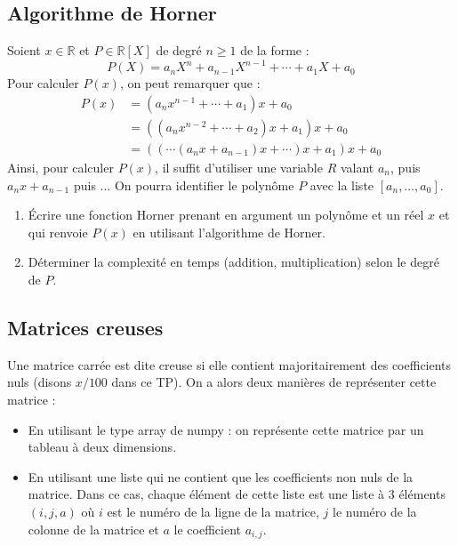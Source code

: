 \documentclass[french,11pt,twoside]{VcCours}
\begin{document}
\subsection{Algorithme de Horner}
Soient $x \in \mathbb{R}$ et $P \in \mathbb{R}[X]$ de degré $n \geq 1$ de la forme :
$$ P(X) = a_n X^n + a_{n-1} X^{n-1} + \cdots + a_1 X + a_0 $$
Pour calculer $P(x)$, on peut remarquer que :
\begin{align*}
P(x) & = (a_n x^{n-1} + \cdots + a_1)x + a_0 \\
& = ((a_n x^{n-2} + \cdots + a_2)x + a_1)x + a_0 \\
& = ((\cdots(a_n x + a_{n-1})x + \cdots)x + a_1)x + a_0
\end{align*}
Ainsi, pour calculer $P(x)$, il suffit d'utiliser une variable $R$ valant $a_n$, puis $a_nx+a_{n-1}$ puis ... On pourra identifier le polynôme $P$ avec la liste $[a_n, \ldots, a_0]$.

\begin{enumerate}
\item Écrire une fonction Horner prenant en argument un polynôme et un réel $x$ et qui renvoie $P(x)$ en utilisant l'algorithme de Horner.
\item Déterminer la complexité en temps (addition, multiplication) selon le degré de $P$.
\end{enumerate}

\subsection{Matrices creuses}

Une matrice carrée est dite creuse si elle contient majoritairement des coefficients nuls (disons $x/100$ dans ce TP). On a alors deux manières de représenter cette matrice :

\begin{itemize}
\item En utilisant le type array de numpy : on représente cette matrice par un tableau à deux dimensions.
\item En utilisant une liste qui ne contient que les coefficients non nuls de la matrice. Dans ce cas, chaque élément de cette liste est une liste à 3 éléments $(i,j,a)$ où $i$ est le numéro de la ligne de la matrice, $j$ le numéro de la colonne de la matrice et $a$ le coefficient $a_{i,j}$.
\end{itemize}
\end{document}
